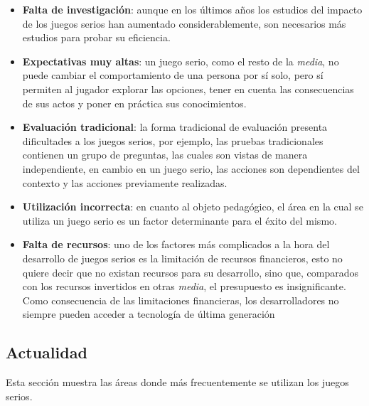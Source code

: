 \begin{itemize}

\item \textbf{Falta de investigación}: aunque en los últimos años los estudios
    del impacto de los juegos serios han aumentado considerablemente, son
    necesarios más estudios para probar su eficiencia\cite{sg:aoverview}.

\item \textbf{Expectativas muy altas}: un juego serio, como el resto de la
    \textit{media}, no puede cambiar el comportamiento de una persona por sí
    solo, pero sí permiten al jugador explorar las opciones, tener en cuenta las
    consecuencias de sus actos y poner en práctica sus
    conocimientos\cite{education:games,stapleton2004serious,videojuegos:gonzaleztardon}. 

\item \textbf{Evaluación tradicional}: la forma tradicional de evaluación presenta
    dificultades a los juegos serios, por ejemplo, las pruebas tradicionales
    contienen un grupo de preguntas, las cuales son vistas de manera
    independiente, en cambio en un juego serio, las acciones son dependientes
    del contexto y las acciones previamente realizadas\cite{shute2009melding}.

\item \textbf{Utilización incorrecta}: en cuanto al objeto pedagógico, el área
    en la cual se utiliza un juego serio es un factor determinante para el éxito
    del mismo\cite{stapleton2004serious}.

\item \textbf{Falta de recursos}: uno de los factores más complicados a la hora
    del desarrollo de juegos serios es la limitación de recursos financieros,
    esto no quiere decir que no existan recursos para su desarrollo, sino que,
    comparados con los recursos invertidos en otras \textit{media}, el
    presupuesto es insignificante\cite{stapleton2004serious,sg:aoverview}. Como
    consecuencia de las limitaciones financieras, los desarrolladores no siempre
    pueden acceder a tecnología de última generación\cite{stapleton2004serious}

\end{itemize}

\subsection{Actualidad}

Esta sección muestra las áreas donde más frecuentemente se utilizan los juegos
serios.

